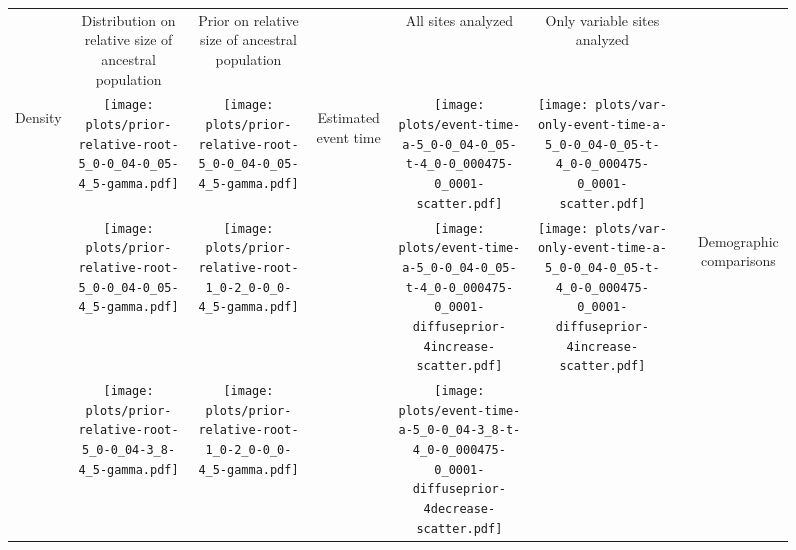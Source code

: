 \documentclass[border=10pt,varwidth=30cm]{standalone}
\begin{document}
\begin{figure}
    \setlength\arrayrulewidth{2pt}
    \centering
    \begin{tabular}{@{}cccccccc@{}}
        & \multirow{1}{0.15\textwidth}{\centering\Large Distribution on relative size of ancestral population}
        & \multirow{1}{0.15\textwidth}{\centering\Large Prior on relative size of ancestral population}
        &
        & \multirow{1}{0.15\textwidth}{\centering\Large All sites analyzed}
        & \multirow{1}{0.15\textwidth}{\centering\Large Only variable sites analyzed}
        & 
        & \\[9ex]
        \multirow{5}{*}[-8em]{\begin{sideways}\large Density\end{sideways}}
        & \texttt{[image: plots/prior-relative-root-5\_0-0\_04-0\_05-4\_5-gamma.pdf]}
        & \texttt{[image: plots/prior-relative-root-5\_0-0\_04-0\_05-4\_5-gamma.pdf]}
        & \multirow{5}{*}[-6em]{\begin{sideways}\large Estimated event time\end{sideways}}
        & \texttt{[image: plots/event-time-a-5\_0-0\_04-0\_05-t-4\_0-0\_000475-0\_0001-scatter.pdf]}
        & \texttt{[image: plots/var-only-event-time-a-5\_0-0\_04-0\_05-t-4\_0-0\_000475-0\_0001-scatter.pdf]} 
        & \multicolumn{1}{c|}{} 
        & \\
        & \texttt{[image: plots/prior-relative-root-5\_0-0\_04-0\_05-4\_5-gamma.pdf]}
        & \texttt{[image: plots/prior-relative-root-1\_0-2\_0-0\_0-4\_5-gamma.pdf]}
        &
        & \texttt{[image: plots/event-time-a-5\_0-0\_04-0\_05-t-4\_0-0\_000475-0\_0001-diffuseprior-4increase-scatter.pdf]}
        & \texttt{[image: plots/var-only-event-time-a-5\_0-0\_04-0\_05-t-4\_0-0\_000475-0\_0001-diffuseprior-4increase-scatter.pdf]}
        & \multicolumn{1}{c|}{} 
        & \multirow{5}{*}[11em]{\begin{sideways}\Large Demographic comparisons\end{sideways}} \\
        & \texttt{[image: plots/prior-relative-root-5\_0-0\_04-3\_8-4\_5-gamma.pdf]}
        & \texttt{[image: plots/prior-relative-root-1\_0-2\_0-0\_0-4\_5-gamma.pdf]}
        &
        & \texttt{[image: plots/event-time-a-5\_0-0\_04-3\_8-t-4\_0-0\_000475-0\_0001-diffuseprior-4decrease-scatter.pdf]}

\end{tabular}
\end{figure}
\end{document}
